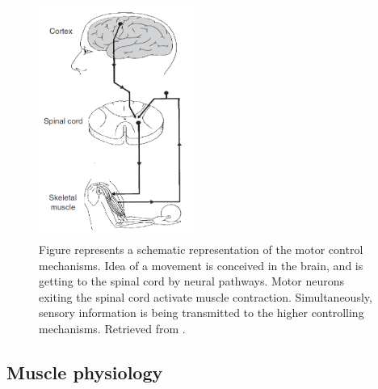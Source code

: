 \begin{figure}[ht]
\centering
\includegraphics[width=0.45\textwidth]{Images/introduction/control-merletti2.png}
\caption{Figure represents a schematic representation of the motor control mechanisms. Idea of a movement is conceived in the brain, and is getting to the spinal cord by neural pathways. Motor neurons exiting the spinal cord activate muscle contraction. Simultaneously, sensory information is being transmitted to the higher controlling mechanisms. Retrieved from \citet{Merletti-book}.}
\label{fig:control-merletti}
\end{figure}


\subsection{Muscle physiology}

